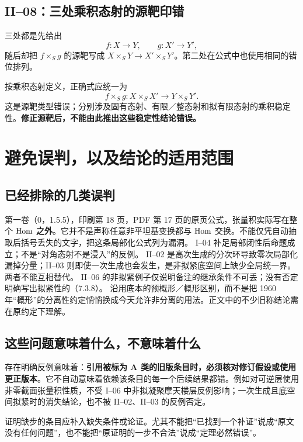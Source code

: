 \section{II--08：三处乘积态射的源靶印错}
三处都是先给出
\[
f:X\longrightarrow Y,\qquad g:X'\longrightarrow Y',
\]
随后却把 $f\times_Sg$ 的源靶写成 $X\times_SY\to X'\times_SY'$。第二处在公式中也使用相同的错位排列。

按乘积态射定义，正确式应统一为
\[
\boxed{f\times_Sg:X\times_SX'\longrightarrow Y\times_SY'.}
\]
这是源靶类型错误；分别涉及固有态射、有限／整态射和拟有限态射的乘积稳定性。\textbf{修正源靶后，不能由此推出这些稳定性结论错误。}

\chapter{避免误判，以及结论的适用范围}
\section{已经排除的几类误判}
第一卷（0，1.5.5），印刷第 18 页，PDF 第 17 页的原页公式，张量积实际写在整个 $\operatorname{Hom}$ \textbf{之外}。它并不是声称任意非平坦基变换都与 $\operatorname{Hom}$ 交换。不能仅凭自动抽取后括号丢失的文字，把这条局部化公式列为漏洞。
I--04 补足局部闭性后命题成立；不是“对角态射不是浸入”的反例。
II--02 是高次生成的分次环导致零次局部化漏掉分量；II--03 则即使一次生成也会发生，是非拟紧底空间上缺少全局统一界。两者不能互相替代。
II--06 的非拟紧例子仅说明备注的继承条件不可丢；没有否定明确写出拟紧性的（7.3.8）。
沿用底本的预概形／概形区别，而不是把 1960 年“概形”的分离性约定悄悄换成今天允许非分离的用法。正文中的不少旧称结论需在原约定下理解。

\section{这些问题意味着什么，不意味着什么}
存在明确反例意味着：\textbf{引用被标为 A 类的旧版条目时，必须核对修订假设或使用更正版本}。它不自动意味着依赖该条目的每一个后续结果都错。例如对可逆层使用非零截面张量积性质，不受 I--06 中非拟凝聚摩天楼层反例影响；一次生成且底空间拟紧时的消失结论，也不被 II--02、II--03 的反例否定。

证明缺步的条目应补入缺失条件或论证。尤其不能把“已找到一个补证”说成“原文没有任何问题”，也不能把“原证明的一步不合法”说成“定理必然错误”。

